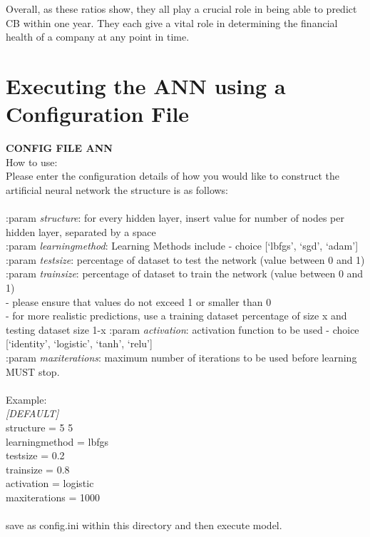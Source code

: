 \documentclass[11pt]{article}
\begin{document}
Overall, as these ratios show, they all play a crucial role in being able to predict CB within one year. They each give a vital role in determining the financial health of a company at any point in time. 

\newpage
\section{Executing the ANN using a Configuration File}
\textbf{CONFIG FILE ANN}\\
How to use:\\
Please enter the configuration details of how you would like to construct the artificial neural network the structure is as follows:\\
\\
   :param \textit{structure}: for every hidden layer, insert value for number of nodes per hidden layer, separated by a space\\
   :param \textit{learning\textunderscore method}: Learning Methods include - choice {[`lbfgs', `sgd', `adam']}\\
   :param \textit{test\textunderscore size}: percentage of dataset to test the network (value between 0 and 1)\\
   :param \textit{train\textunderscore size}: percentage of dataset to train the network (value between 0 and 1)\\
   -  please ensure that values do not exceed 1 or smaller than 0\\
   -  for more realistic predictions, use a training dataset percentage of size x and testing dataset size 1-x
   :param \textit{activation}: activation function to be used - choice {[`identity', `logistic', `tanh', `relu']}\\
   :param \textit{max\textunderscore iterations}: maximum number of iterations to be used before learning MUST stop.\\
\\
Example:\\
\textit{[DEFAULT] }\\
structure =  5 5 \\
learning\textunderscore method = lbfgs \\
test\textunderscore size = 0.2 \\
train\textunderscore size = 0.8 \\
activation = logistic \\
max\textunderscore iterations = 1000 \\
\\
save as config.ini within this directory and then execute model.
\end{document}
